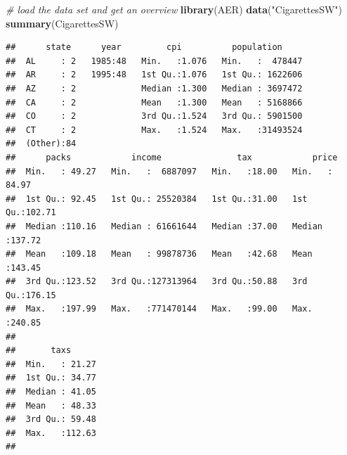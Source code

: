 \documentclass[]{book}
\newenvironment{Shaded}{\begin{snugshade}}{\end{snugshade}}
\newcommand{\KeywordTok}[1]{\textcolor[rgb]{0.13,0.29,0.53}{\textbf{#1}}}
\newcommand{\StringTok}[1]{\textcolor[rgb]{0.31,0.60,0.02}{#1}}
\newcommand{\CommentTok}[1]{\textcolor[rgb]{0.56,0.35,0.01}{\textit{#1}}}
\newcommand{\NormalTok}[1]{#1}
\begin{document}
\begin{Shaded}
\begin{Highlighting}[]
\CommentTok{# load the data set and get an overview}
\KeywordTok{library}\NormalTok{(AER)}
\KeywordTok{data}\NormalTok{(}\StringTok{"CigarettesSW"}\NormalTok{)}
\KeywordTok{summary}\NormalTok{(CigarettesSW)}
\end{Highlighting}
\end{Shaded}

\begin{verbatim}
##      state      year         cpi          population      
##  AL     : 2   1985:48   Min.   :1.076   Min.   :  478447  
##  AR     : 2   1995:48   1st Qu.:1.076   1st Qu.: 1622606  
##  AZ     : 2             Median :1.300   Median : 3697472  
##  CA     : 2             Mean   :1.300   Mean   : 5168866  
##  CO     : 2             3rd Qu.:1.524   3rd Qu.: 5901500  
##  CT     : 2             Max.   :1.524   Max.   :31493524  
##  (Other):84                                               
##      packs            income               tax            price       
##  Min.   : 49.27   Min.   :  6887097   Min.   :18.00   Min.   : 84.97  
##  1st Qu.: 92.45   1st Qu.: 25520384   1st Qu.:31.00   1st Qu.:102.71  
##  Median :110.16   Median : 61661644   Median :37.00   Median :137.72  
##  Mean   :109.18   Mean   : 99878736   Mean   :42.68   Mean   :143.45  
##  3rd Qu.:123.52   3rd Qu.:127313964   3rd Qu.:50.88   3rd Qu.:176.15  
##  Max.   :197.99   Max.   :771470144   Max.   :99.00   Max.   :240.85  
##                                                                       
##       taxs       
##  Min.   : 21.27  
##  1st Qu.: 34.77  
##  Median : 41.05  
##  Mean   : 48.33  
##  3rd Qu.: 59.48  
##  Max.   :112.63  
## 
\end{verbatim}
\end{document}

